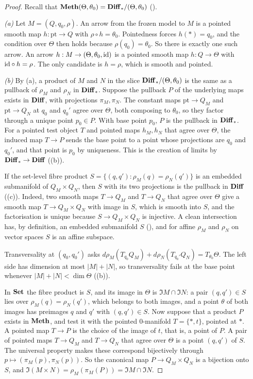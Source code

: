 \begin{proof}
Recall that $\mathbf{Meth}(\Theta,\theta_0)=\mathbf{Diff}_*/(\Theta,\theta_0)$ ().

\emph{(a)} Let $M=(Q,q_0,\rho)$. An arrow from the frozen model to $M$ is a pointed smooth map $h:\mathrm{pt}\to Q$ with
$\rho\circ h=\theta_0$. Pointedness forces $h(*)=q_0$, and the condition over $\Theta$ then holds because
$\rho(q_0)=\theta_0$. So there is exactly one such arrow. An arrow $h:M\to(\Theta,\theta_0,\mathrm{id})$ is a pointed smooth map
$h:Q\to\Theta$ with $\mathrm{id}\circ h=\rho$. The only candidate is $h=\rho$, which is smooth and pointed.

\emph{(b)} By (a), a product of $M$ and $N$ in the slice $\mathbf{Diff}_*/(\Theta,\theta_0)$ is the same as a pullback
of $\rho_M$ and $\rho_N$ in $\mathbf{Diff}_*$. Suppose the pullback $P$ of the underlying maps exists in $\mathbf{Diff}$, with projections
$\pi_M,\pi_N$. The constant maps $\mathrm{pt}\to Q_M$ and $\mathrm{pt}\to Q_N$ at $q_0$ and $q_0'$ agree over $\Theta$,
both composing to $\theta_0$, so they factor through a unique point $p_0\in P$. With base point $p_0$, $P$ is the pullback
in $\mathbf{Diff}_*$. For a pointed test object $T$ and pointed maps $h_M,h_N$ that agree over $\Theta$, the induced map $T\to P$
sends the base point to a point whose projections are $q_0$ and $q_0'$, and that point is $p_0$ by uniqueness. This is
the creation of limits by $\mathbf{Diff}_*\to\mathbf{Diff}$ ((b)).

If the set-level fibre product $S=\{(q,q'):\rho_M(q)=\rho_N(q')\}$ is an embedded submanifold of $Q_M\times Q_N$, then $S$
with its two projections is the pullback in $\mathbf{Diff}$ ((c)). Indeed, two smooth maps $T\to Q_M$ and $T\to Q_N$
that agree over $\Theta$ give a smooth map $T\to Q_M\times Q_N$ with image in $S$, which is smooth into $S$, and the
factorisation is unique because $S\to Q_M\times Q_N$ is injective. A clean intersection has, by definition, an embedded
submanifold $S$ (), and for affine $\rho_M$ and $\rho_N$ on vector spaces $S$ is an affine subspace.

Transversality at $(q_0,q_0')$ asks $d\rho_M(T_{q_0}Q_M)+d\rho_N(T_{q_0'}Q_N)=T_{\theta_0}\Theta$. The left side has
dimension at most $\lvert M\rvert+\lvert N\rvert$, so transversality fails at the base point whenever
$\lvert M\rvert+\lvert N\rvert<\dim\Theta$ ((b)).

In $\mathbf{Set}$ the fibre product is $S$, and its image in $\Theta$ is $\Im M\cap\Im N$: a pair $(q,q')\in S$ lies over
$\rho_M(q)=\rho_N(q')$, which belongs to both images, and a point $\theta$ of both images has preimages $q$ and $q'$ with
$(q,q')\in S$. Now suppose that a product $P$ exists in $\mathbf{Meth}$, and test it with the pointed $0$-manifold
$T=\{*,t\}$, pointed at $*$. A pointed map $T\to P$ is the choice of the image of $t$, that is, a point of $P$. A pair of
pointed maps $T\to Q_M$ and $T\to Q_N$ that agree over $\Theta$ is a point $(q,q')$ of $S$. The universal property makes
these correspond bijectively through $p\mapsto(\pi_M(p),\pi_N(p))$. So the canonical map $P\to Q_M\times Q_N$ is a bijection
onto $S$, and $\Im(M\times N)=\rho_M(\pi_M(P))=\Im M\cap\Im N$.


\end{proof}
